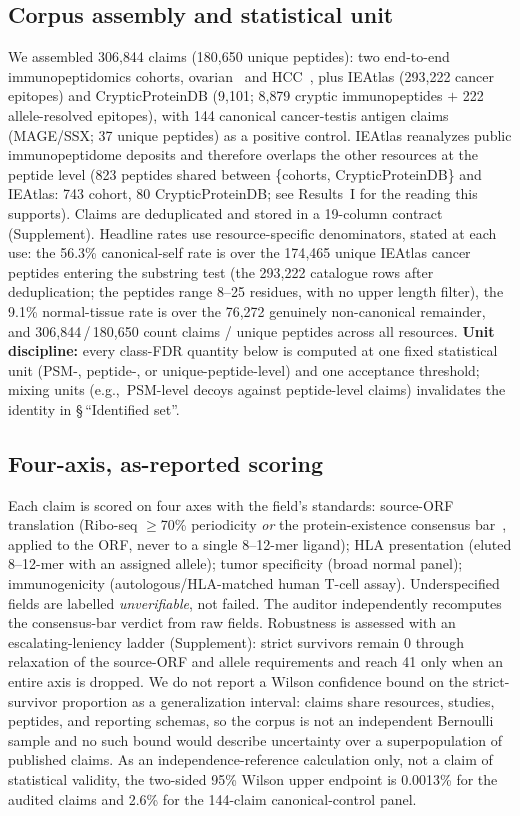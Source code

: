 \subsection{Corpus assembly and statistical unit}
We assembled 306{,}844 claims (180{,}650 unique peptides): two end-to-end immunopeptidomics cohorts, ovarian~\cite{r1} and HCC~\cite{r2}, plus IEAtlas (293{,}222 cancer epitopes) and CrypticProteinDB (9{,}101; 8{,}879 cryptic immunopeptides $+$ 222 allele-resolved epitopes), with 144 canonical cancer-testis antigen claims (MAGE/SSX; 37 unique peptides) as a positive control. IEAtlas reanalyzes public immunopeptidome deposits and therefore overlaps the other resources at the peptide level (823 peptides shared between \{cohorts, CrypticProteinDB\} and IEAtlas: 743 cohort, 80 CrypticProteinDB; see Results~I for the reading this supports). Claims are deduplicated and stored in a 19-column contract (Supplement). Headline rates use resource-specific denominators, stated at each use: the 56.3\% canonical-self rate is over the 174{,}465 unique IEAtlas cancer peptides entering the substring test (the 293{,}222 catalogue rows after deduplication; the peptides range 8--25 residues, with no upper length filter), the 9.1\% normal-tissue rate is over the 76{,}272 genuinely non-canonical remainder, and 306{,}844\,/\,180{,}650 count claims / unique peptides across all resources. \textbf{Unit discipline:} every class-FDR quantity below is computed at one fixed statistical unit (PSM-, peptide-, or unique-peptide-level) and one acceptance threshold; mixing units (e.g.,\ PSM-level decoys against peptide-level claims) invalidates the identity in \S\,``Identified set''.

\subsection{Four-axis, as-reported scoring}
Each claim is scored on four axes with the field's standards: source-ORF translation (Ribo-seq $\ge$70\% periodicity \emph{or} the protein-existence consensus bar~\cite{r3}, applied to the ORF, never to a single 8--12-mer ligand); HLA presentation (eluted 8--12-mer with an assigned allele); tumor specificity (broad normal panel); immunogenicity (autologous/HLA-matched human T-cell assay). Underspecified fields are labelled \emph{unverifiable}, not failed. The auditor independently recomputes the consensus-bar verdict from raw fields. Robustness is assessed with an escalating-leniency ladder (Supplement): strict survivors remain 0 through relaxation of the source-ORF and allele requirements and reach 41 only when an entire axis is dropped. We do not report a Wilson confidence bound on the strict-survivor proportion as a generalization interval: claims share resources, studies, peptides, and reporting schemas, so the corpus is not an independent Bernoulli sample and no such bound would describe uncertainty over a superpopulation of published claims. As an independence-reference calculation only, not a claim of statistical validity, the two-sided 95\% Wilson upper endpoint is 0.0013\% for the audited claims and 2.6\% for the 144-claim canonical-control panel.

